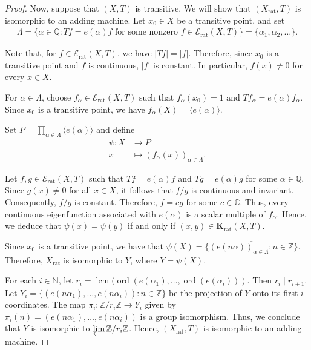 \documentclass[11pt,reqno]{amsart}
\newcommand{\C}{\mathbb{C}}
\newcommand{\Q}{\mathbb{Q}}
\newcommand{\Z}{\mathbb{Z}}
\newcommand{\N}{\mathbb{N}}
\newcommand{\Krat}{\mathbf{K}_{\operatorname{rat}}}
\theoremstyle{definition}
\theoremstyle{remark}
\begin{document}
\begin{proof}


    Now, suppose that $(X,T)$ is transitive. We will show that $(X_{\operatorname{rat}},T)$ is isomorphic to an adding machine. Let $x_0\in X$ be a transitive point, and set\begin{align*}
        \Lambda = \{\alpha\in\Q: Tf = e(\alpha)f \text{ for some nonzero }f\in \mathcal{E}_{\operatorname{rat}}(X,T)\} = \{\alpha_1,\alpha_2,\dots\}.
    \end{align*}

    Note that, for $f\in \mathcal{E}_{\operatorname{rat}}(X,T)$, we have $|Tf|=|f|$. Therefore, since $x_0$ is a transitive point and $f$ is continuous, $|f|$ is constant. In particular, $f(x)\neq 0$ for every $x\in X$.
    
    For $\alpha \in \Lambda$, choose  $f_\alpha\in \mathcal{E}_{\operatorname{rat}}(X,T)$ such that $f_\alpha(x_0)=1$ and $Tf_\alpha = e(\alpha)f_\alpha$. Since $x_0$ is a transitive point, we have $f_\alpha(X) = \langle e(\alpha)\rangle$. 

    Set $P = \prod_{\alpha\in \Lambda} \langle e(\alpha)\rangle$ and define\begin{align*}
        \psi: X&\to P \\ x &\mapsto (f_\alpha(x))_{\alpha\in \Lambda}.
    \end{align*}

    Let $f,g\in \mathcal{E}_{\operatorname{rat}}(X,T)$ such that $Tf = e(\alpha)f$ and $Tg = e(\alpha)g$ for some $\alpha\in\Q$. Since $g(x)\neq 0$ for all $x\in X$, it follows that $f/g$ is continuous and invariant. Consequently, $f/g$ is constant. Therefore, $f=cg$ for some $c\in \C$. Thus, every continuous eigenfunction associated with $e(\alpha)$ is a scalar multiple of $f_\alpha$. Hence, we deduce that $\psi(x)=\psi(y)$ if and only if $(x,y)\in \Krat(X,T)$.

    Since $x_0$ is a transitive point, we have that $\psi(X)= \overline{\{(e(n\alpha))_{\alpha\in \Lambda}: n\in\Z\}}$. Therefore, $X_{\operatorname{rat}}$ is isomorphic to $Y$, where $Y=\psi(X)$.

    For each $i\in \N$, let $r_i = \operatorname{lcm}(\operatorname{ord}(e(\alpha_1),\dots,\operatorname{ord}(e(\alpha_i)))$. Then $r_i\mid r_{i+1}$. Let $Y_i = \{(e(n\alpha_1),\dots,e(n\alpha_i)):n\in\Z\}$ be the projection of $Y$ onto its first $i$ coordinates. The map $\pi_i: \Z/r_i\Z\to Y_i$ given by $\pi_i(n)=(e(n\alpha_1),\dots,e(n\alpha_i))$ is a group isomorphism. Thus, we conclude that $Y$ is isomorphic to $\varprojlim \Z/r_i \Z$. Hence, $(X_{\operatorname{rat}},T)$ is isomorphic to an adding machine.
\end{proof}
\end{document}
